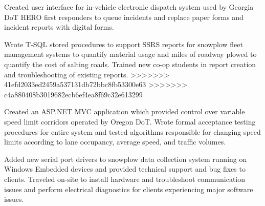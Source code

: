 \begin{cventries}
{\begin{cvitems}
		\item {Created user interface for in-vehicle electronic dispatch system used by Georgia DoT HERO first responders to queue incidents and replace paper forms and incident reports with digital forms.}
		\item {Wrote T-SQL stored procedures to support SSRS reports for snowplow fleet management systems to quantify material usage and miles of roadway plowed to quantify the cost of salting roads. Trained new co-op students in report creation and troubleshooting of existing reports.}
>>>>>>> 41efd2033ed2459a537131db72bbc8fb53300e63
>>>>>>> c4a880408b3019682ecb6ef4ea8f69c32e613299
		\item {Created an ASP.NET MVC application which provided control over variable speed limit corridors operated by Oregon DoT. Wrote formal acceptance testing procedures for entire system and tested algorithms responsible for changing speed limits according to lane occupancy, average speed, and traffic volumes.}
		\item {Added new serial port drivers to snowplow data collection system running on Windows Embedded devices and provided technical support and bug fixes to clients. Traveled on-site to install hardware and troubleshoot communication issues and perform electrical diagnostics for clients experiencing major software issues.}
      \end{cvitems}
    }

\end{cventries}
